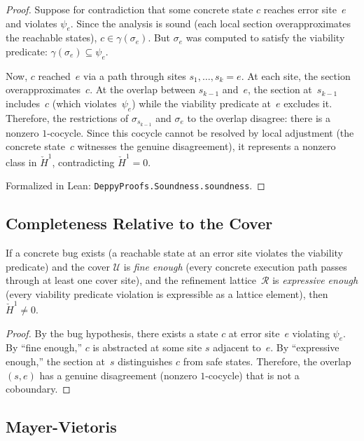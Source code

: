 \documentclass[acmsmall,screen,review,anonymous]{acmart}
\theoremstyle{remark}
\newcommand{\Hc}[1]{\check{H}^{#1}}
\begin{document}
\begin{proof}
Suppose for contradiction that some concrete state $c$ reaches error
site~$e$ and violates $\psi_e$.  Since the analysis is sound
(each local section overapproximates the reachable states),
$c \in \gamma(\sigma_e)$.  But $\sigma_e$ was computed to satisfy the
viability predicate: $\gamma(\sigma_e) \subseteq \psi_e$.

Now, $c$ reached~$e$ via a path through sites $s_1, \ldots, s_k = e$.
At each site, the section overapproximates~$c$.  At the overlap between
$s_{k-1}$ and~$e$, the section at~$s_{k-1}$ includes~$c$ (which
violates~$\psi_e$) while the viability predicate at~$e$ excludes it.
Therefore, the restrictions of $\sigma_{s_{k-1}}$ and $\sigma_e$ to
the overlap disagree: there is a nonzero $1$-cocycle.  Since this
cocycle cannot be resolved by local adjustment (the concrete state~$c$
witnesses the genuine disagreement), it represents a nonzero class
in $\Hc{1}$, contradicting $\Hc{1} = 0$.

Formalized in Lean: \texttt{DeppyProofs.Soundness.soundness}.
\end{proof}

\subsection{Completeness Relative to the Cover}\label{sec:completeness}

\begin{theorem}\label{thm:completeness}
If a concrete bug exists (a reachable state at an error site violates
the viability predicate) and the cover $\mathcal{U}$ is
\emph{fine enough} (every concrete execution path passes through at
least one cover site), and the refinement lattice~$\mathcal{R}$ is
\emph{expressive enough} (every viability predicate violation is
expressible as a lattice element), then $\Hc{1} \neq 0$.
\end{theorem}

\begin{proof}
By the bug hypothesis, there exists a state $c$ at error site~$e$
violating $\psi_e$.  By ``fine enough,'' $c$ is abstracted at some site
$s$ adjacent to~$e$.  By ``expressive enough,'' the section at~$s$
distinguishes $c$ from safe states.  Therefore, the overlap $(s, e)$ has
a genuine disagreement (nonzero $1$-cocycle) that is not a coboundary.
\end{proof}

\subsection{Mayer-Vietoris}\label{sec:mayer-vietoris}
\end{document}
